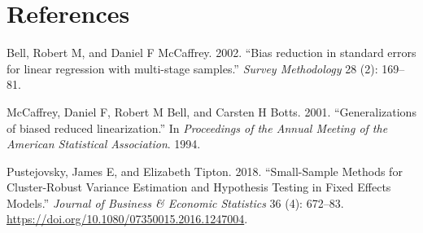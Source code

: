 \documentclass[12pt]{article}
\newlength{\cslhangindent}
\newlength{\cslentryspacingunit} %
\newenvironment{CSLReferences}[2] %
 {%
  \setlength{\parindent}{0pt}
  \ifodd #1
  \let\oldpar\par
  \def\par{\hangindent=\cslhangindent\oldpar}
  \fi
  \setlength{\parskip}{#2\cslentryspacingunit}
 }%
 {}
\begin{document}
\hypertarget{references}{%
\section*{References}\label{references}}

\hypertarget{refs}{}
\begin{CSLReferences}{1}{0}
\leavevmode{}%
Bell, Robert M, and Daniel F McCaffrey. 2002. {``{Bias reduction in
standard errors for linear regression with multi-stage samples}.''}
\emph{Survey Methodology} 28 (2): 169--81.

\leavevmode{}%
McCaffrey, Daniel F, Robert M Bell, and Carsten H Botts. 2001.
{``{Generalizations of biased reduced linearization}.''} In
\emph{Proceedings of the Annual Meeting of the American Statistical
Association}. 1994.

\leavevmode{}%
Pustejovsky, James E, and Elizabeth Tipton. 2018. {``Small-Sample
Methods for Cluster-Robust Variance Estimation and Hypothesis Testing in
Fixed Effects Models.''} \emph{Journal of Business \& Economic
Statistics} 36 (4): 672--83.
\url{https://doi.org/10.1080/07350015.2016.1247004}.

\end{CSLReferences}



\end{document}
